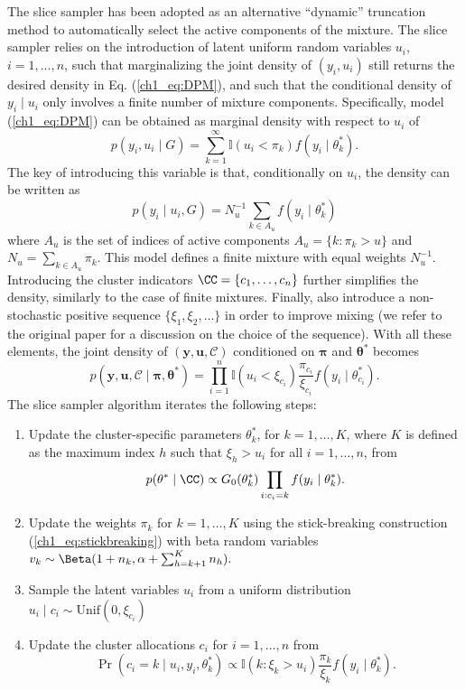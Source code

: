 The slice sampler \parencite{walker2007, kalli2011} has been adopted as an alternative ``dynamic'' truncation method to automatically select the active components of the mixture. 
The slice sampler relies on the introduction of latent uniform random variables $u_i$, $i=1,\dots,n$, such that 
marginalizing the joint density of $(y_i,u_i)$ still returns the desired density in Eq. (\ref{ch1_eq:DPM}), and such that the conditional density of $y_i\mid u_i$ only involves a finite number of mixture components.
Specifically, model (\ref{ch1_eq:DPM}) can be obtained as marginal density with respect to $u_i$ of
\begin{equation*}
p(y_i,u_i\mid G) = \sum_{k=1}^{\infty} \mathbb{I}(u_i<\pi_k) f(y_i\mid\theta^*_k).
\end{equation*} 
The key of introducing this variable is that, conditionally on $u_i$, the density can be written as
\begin{equation*}
p(y_i\mid u_i, G) = N_u^{-1} \sum_{k\in A_u} f(y_i\mid\theta^*_k)
\end{equation*}
where $A_u$ is the set of indices of active components $A_u = \{k:\pi_k >u\}$ and $N_u = \sum_{k\in A_u} \pi_k$. This model defines a finite mixture with equal weights $N_u^{-1}$.
Introducing the cluster indicators $\CC = \{c_1,\dots,c_n\}$ further simplifies the density, similarly to the case of finite mixtures. Finally, \textcite{kalli2011} also introduce a non-stochastic positive sequence $\{\xi_1,\xi_2,\dots\}$ in order to improve mixing (we refer to the original paper for a discussion on the choice of the sequence). With all these elements, the joint density of $(\bm{y},\bm{u},\mathcal{C})$ conditioned on $\bm{\pi}$ and $\bm{\theta}^*$ becomes
\begin{equation}
p(\bm{y},\bm{u},\mathcal{C} \mid \bm{\pi},\bm{\theta}^*) = \prod_{i=1}^n \mathbb{I}(u_i < \xi_{c_i}) \frac{\pi_{c_i}}{\xi_{c_i}} f(y_i\mid\theta^*_{c_i}).
\label{ch1_eq:sliceDPMlik}
\end{equation}
The slice sampler algorithm iterates the following steps:
\begin{enumerate}
	\item Update the cluster-specific parameters $\theta^*_k$, for $k=1,\dots,K$, where $K$ is defined as the maximum index $h$ such that $\xi_h > u_i$ for all $i=1,\dots,n$, from
	$$p(\theta^*\mid \CC) \propto G_0(\theta^*_k)\prod_{i:c_i=k} f(y_i\mid\theta^*_k).$$
	\item Update the weights $\pi_k$ for $k=1,\dots,K$ using the stick-breaking construction (\ref{ch1_eq:stickbreaking}) with beta random variables $v_k\sim\Beta(1+n_k, \alpha + \sum_{h=k+1}^{K} n_h).$
	\item Sample the latent variables $u_i$ from a uniform distribution $u_i \mid c_i \sim \mathrm{Unif}(0,\xi_{c_i})$
	\item Update the cluster allocations $c_i$ for $i=1,\dots,n$ from
	$$\Pr(c_i = k\mid u_i, y_i, \theta^*_k)\propto \mathbb{I}(k:\xi_k > u_i) \frac{\pi_k}{\xi_k} f(y_i\mid\theta^*_k).$$
\end{enumerate}



